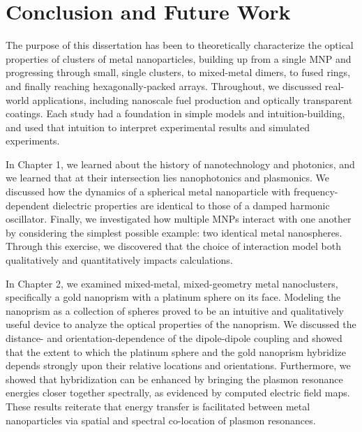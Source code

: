 \documentclass [11pt, proquest] {uwthesis}[2016/11/22]
\begin{document}

\chapter{Conclusion and Future Work}

The purpose of this dissertation has been to theoretically characterize the optical properties of clusters of metal nanoparticles, building up from a single MNP and progressing through small, single clusters, to mixed-metal dimers, to fused rings, and finally reaching hexagonally-packed arrays. Throughout, we discussed real-world applications, including nanoscale fuel production and optically transparent coatings. Each study had a foundation in simple models and intuition-building, and used that intuition to interpret experimental results and simulated experiments.

In Chapter 1, we learned about the history of nanotechnology and photonics, and we learned that at their intersection lies nanophotonics and plasmonics. We discussed how the dynamics of a spherical metal nanoparticle with frequency-dependent dielectric properties are identical to those of a damped harmonic oscillator. Finally, we investigated how multiple MNPs interact with one another by considering the simplest possible example: two identical metal nanospheres. Through this exercise, we discovered that the choice of interaction model both qualitatively and quantitatively impacts calculations.

In Chapter 2, we examined mixed-metal, mixed-geometry metal nanoclusters, specifically a gold nanoprism with a platinum sphere on its face. Modeling the nanoprism as a collection of spheres proved to be an intuitive and qualitatively useful device to analyze the optical properties of the nanoprism. We discussed the distance- and orientation-dependence of the dipole-dipole coupling and showed that the extent to which the platinum sphere and the gold nanoprism hybridize depends strongly upon their relative locations and orientations. Furthermore, we showed that hybridization can be enhanced by bringing the plasmon resonance energies closer together spectrally, as evidenced by computed electric field maps. These results reiterate that energy transfer is facilitated between metal nanoparticles via spatial and spectral co-location of plasmon resonances.
\end{document}
